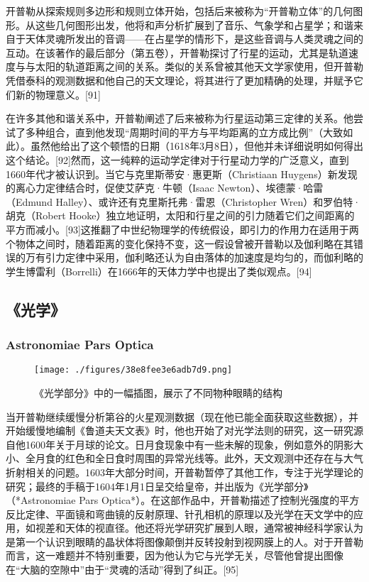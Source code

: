 开普勒从探索规则多边形和规则立体开始，包括后来被称为“开普勒立体”的几何图形。从这些几何图形出发，他将和声分析扩展到了音乐、气象学和占星学；和谐来自于天体灵魂所发出的音调——在占星学的情形下，是这些音调与人类灵魂之间的互动。在该著作的最后部分（第五卷），开普勒探讨了行星的运动，尤其是轨道速度与与太阳的轨道距离之间的关系。类似的关系曾被其他天文学家使用，但开普勒凭借泰科的观测数据和他自己的天文理论，将其进行了更加精确的处理，并赋予它们新的物理意义。[91]

在许多其他和谐关系中，开普勒阐述了后来被称为行星运动第三定律的关系。他尝试了多种组合，直到他发现“周期时间的平方与平均距离的立方成比例”（大致如此）。虽然他给出了这个顿悟的日期（1618年3月8日），但他并未详细说明如何得出这个结论。[92]然而，这一纯粹的运动学定律对于行星动力学的广泛意义，直到1660年代才被认识到。当它与克里斯蒂安·惠更斯（Christiaan Huygens）新发现的离心力定律结合时，促使艾萨克·牛顿（Isaac Newton）、埃德蒙·哈雷（Edmund Halley）、或许还有克里斯托弗·雷恩（Christopher Wren）和罗伯特·胡克（Robert Hooke）独立地证明，太阳和行星之间的引力随着它们之间距离的平方而减小。[93]这推翻了中世纪物理学的传统假设，即引力的作用力在适用于两个物体之间时，随着距离的变化保持不变，这一假设曾被开普勒以及伽利略在其错误的万有引力定律中采用，伽利略还认为自由落体的加速度是均匀的，而伽利略的学生博雷利（Borrelli）在1666年的天体力学中也提出了类似观点。[94]
\subsection{《光学》}
\subsubsection{Astronomiae Pars Optica}
\begin{figure}[ht]
\centering
\texttt{[image: ./figures/38e8fee3e6adb7d9.png]}
\caption{《光学部分》中的一幅插图，展示了不同物种眼睛的结构} \label{fig_KPL1_16}
\end{figure}
当开普勒继续缓慢分析第谷的火星观测数据（现在他已能全面获取这些数据），并开始缓慢地编制《鲁道夫天文表》时，他也开始了对光学法则的研究，这一研究源自他1600年关于月球的论文。日月食现象中有一些未解的现象，例如意外的阴影大小、全月食的红色和全日食时周围的异常光线等。此外，天文观测中还存在与大气折射相关的问题。1603年大部分时间，开普勒暂停了其他工作，专注于光学理论的研究；最终的手稿于1604年1月1日呈交给皇帝，并出版为《光学部分》（*Astronomiae Pars Optica*）。在这部作品中，开普勒描述了控制光强度的平方反比定律、平面镜和弯曲镜的反射原理、针孔相机的原理以及光学在天文学中的应用，如视差和天体的视直径。他还将光学研究扩展到人眼，通常被神经科学家认为是第一个认识到眼睛的晶状体将图像颠倒并反转投射到视网膜上的人。对于开普勒而言，这一难题并不特别重要，因为他认为它与光学无关，尽管他曾提出图像在“大脑的空隙中”由于“灵魂的活动”得到了纠正。[95]


